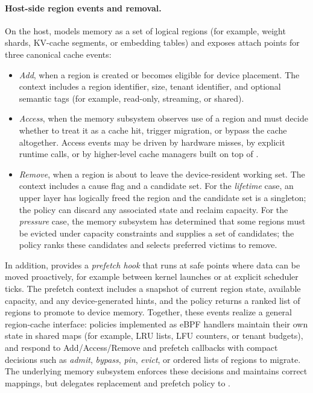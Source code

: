 \paragraph{Host-side region events and removal.}
On the host, \sys models memory as a set of logical regions (for example, weight
shards, KV-cache segments, or embedding tables) and exposes attach points for three
canonical cache events:

\begin{itemize}[leftmargin=*]
  \item \emph{Add}, when a region is created or becomes eligible for device placement.
        The context includes a region identifier, size, tenant identifier, and
        optional semantic tags (for example, read-only, streaming, or shared).
  \item \emph{Access}, when the memory subsystem observes use of a region and must
        decide whether to treat it as a cache hit, trigger migration, or bypass
        the cache altogether. Access events may be driven by hardware misses,
        by explicit runtime calls, or by higher-level cache managers built on top
        of \sys.
  \item \emph{Remove}, when a region is about to leave the device-resident working
        set. The context includes a cause flag and a candidate set. For the
        \emph{lifetime} case, an upper layer has logically freed the region and
        the candidate set is a singleton; the policy can discard any associated
        state and reclaim capacity. For the \emph{pressure} case, the memory
        subsystem has determined that some regions must be evicted under capacity
        constraints and supplies a set of candidates; the policy ranks these
        candidates and selects preferred victims to remove.
\end{itemize}

In addition, \sys provides a \emph{prefetch hook} that runs at safe points where
data can be moved proactively, for example between kernel launches or at explicit
scheduler ticks. The prefetch context includes a snapshot of current region state,
available capacity, and any device-generated hints, and the policy returns a ranked
list of regions to promote to device memory. Together, these events realize a
general region-cache interface: policies implemented as eBPF handlers maintain their
own state in shared maps (for example, LRU lists, LFU counters, or tenant budgets),
and respond to Add/Access/Remove and prefetch callbacks with compact decisions
such as \emph{admit}, \emph{bypass}, \emph{pin}, \emph{evict}, or ordered lists
of regions to migrate. The underlying memory subsystem enforces these decisions
and maintains correct mappings, but delegates replacement and prefetch policy to
\sys.


